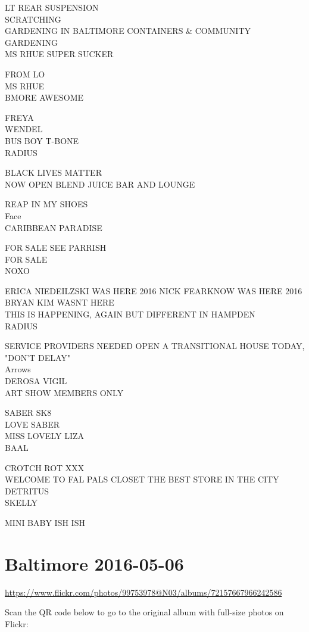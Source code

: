 \documentclass[10pt,letterpaper]{article}
\begin{document}
LT REAR SUSPENSION\\
SCRATCHING\\
GARDENING IN BALTIMORE CONTAINERS \& COMMUNITY GARDENING\\
MS RHUE SUPER SUCKER

FROM LO\\
MS RHUE\\
BMORE AWESOME

FREYA\\
WENDEL\\
BUS BOY T{-}BONE\\
RADIUS

BLACK LIVES MATTER\\
NOW OPEN BLEND JUICE BAR AND LOUNGE

REAP IN MY SHOES\\
Face\\
CARIBBEAN PARADISE

FOR SALE SEE PARRISH\\
FOR SALE\\
NOXO

ERICA NIEDEILZSKI WAS HERE 2016 NICK FEARKNOW WAS HERE 2016 BRYAN KIM WASNT HERE\\
THIS IS HAPPENING, AGAIN BUT DIFFERENT IN HAMPDEN\\
RADIUS

SERVICE PROVIDERS NEEDED OPEN A TRANSITIONAL HOUSE TODAY, "DON'T DELAY"\\
Arrows\\
DEROSA VIGIL\\
ART SHOW MEMBERS ONLY

SABER SK8\\
LOVE SABER\\
MISS LOVELY LIZA\\
BAAL

CROTCH ROT XXX\\
WELCOME TO FAL PALS CLOSET THE BEST STORE IN THE CITY\\
DETRITUS\\
SKELLY

MINI BABY ISH ISH
\

\section*{Baltimore 2016-05-06}

\url{https://www.flickr.com/photos/99753978@N03/albums/72157667966242586}

Scan the QR code below to go to the original album with full-size photos on Flickr:
\end{document}
